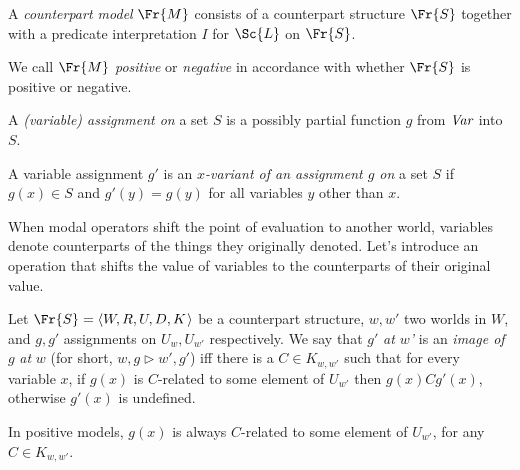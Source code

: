 \documentclass[11pt]{woarticle}
\theoremstyle{break}
\theoremstyle{nonumberplain}
\newcommand{\Img}{\triangleright}
\newcommand{\1}{\;\,|\;\,}
\renewcommand{\t}[1]{\ensuremath{\langle #1  \makebox[.2ex]{}\rangle}}
\begin{document}
\begin{definition}\label{!MOD}
  A \emph{counterpart model} $\Fr{M}$ consists of a counterpart structure
  $\Fr{S}$ together with a predicate interpretation $I$ for $\Sc{L}$ on
  $\Fr{S}$.

  We call $\Fr{M}$ \emph{positive} or \emph{negative} in accordance with whether
  $\Fr{S}$ is positive or negative.  
\end{definition}


\begin{definition}[Assignment]\label{!ASSIGNMENT}
  A \emph{(variable) assignment on} a set $S$ is a possibly partial function $g$
  from $\emph{Var}$ into $S$.
\end{definition}

\begin{definition}[Variant]\label{!VARIANT}
  A variable assignment $g'$ is an \emph{$x$-variant of an assignment $g$ on} a
    set $S$ if $g(x) \in S$ and $g'(y) = g(y)$ for all variables $y$ other than
  $x$.
\end{definition}

When modal operators shift the point of evaluation to another world, variables
denote counterparts of the things they originally denoted. Let's introduce an
operation that shifts the value of variables to the counterparts of their
original value.

\begin{definition}[Image]\label{!IMG}
  Let $\Fr{S} = \t{W,R,U,D,K}$ be a counterpart structure, $w,w'$ two worlds in
  $W$, and $g,g'$ assignments on $U_{w},U_{w'}$ respectively. We say that $g'$
  \emph{at $w$'} is an \emph{image of} $g$ \emph{at} $w$ (for short,
  $w,g \Img w',g'$) iff there is a $C \in K_{w,w'}$ such that for every variable
  $x$, if $g(x)$ is $C$-related to some element of $U_{w'}$ then $g(x) C g'(x)$,
  otherwise $g'(x)$ is undefined.
\end{definition}

In positive models, $g(x)$ is always $C$-related to some element of $U_{w'}$,
for any $C \in K_{w,w'}$.
\end{document}
